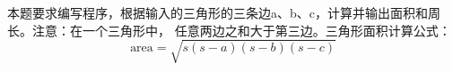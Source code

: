 本题要求编写程序，根据输入的三角形的三条边a、b、c，计算并输出面积和周长。注意：在一个三角形中， 任意两边之和大于第三边。三角形面积计算公式：
\begin{equation}
\text {area}=\sqrt{s(s-a)(s-b)(s-c)}
\end{equation}
